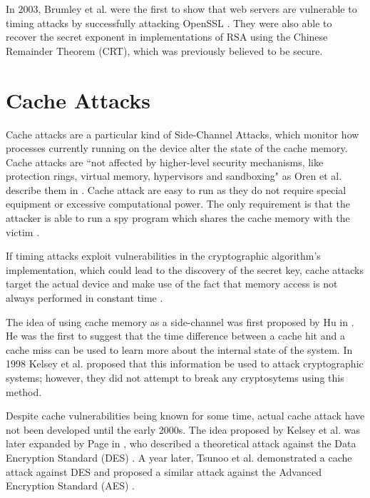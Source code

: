\documentclass[10pt,a4paper,twoside]{book}
\begin{document}
In 2003, Brumley et al. \cite{brumley2005remote} were the first to show that web servers are vulnerable to timing attacks by successfully attacking OpenSSL \cite{openssl}. They were also able to recover the secret exponent in implementations of RSA using the Chinese Remainder Theorem (CRT), which was previously believed to be secure. 

\section{Cache Attacks}
\label{tb:cacheAttacks}
Cache attacks are a particular kind of Side-Channel Attacks, which monitor how processes currently running on the device alter the state of the cache memory. Cache attacks are ``not affected by higher-level security mechanisms, like protection rings, virtual memory, hypervisors and sandboxing" as Oren et al. describe them in \cite{oren2015spy}. Cache attack are easy to run as they do not require special equipment or excessive computational power. The only requirement is that the attacker is able to run a spy program which shares the cache memory with the victim \cite{oren2015spy}.

If timing attacks exploit vulnerabilities in the cryptographic algorithm's implementation, which could lead to the discovery of the secret key, cache attacks target the actual device and make use of the fact that memory access is not always performed in constant time \cite{canteaut2006understanding}.

The idea of using cache memory as a side-channel was first proposed by Hu in \cite{hu1992lattice}. He was the first to suggest that the time difference between a cache hit and a cache miss can be used to learn more about the internal state of the system. In 1998 Kelsey et al. \cite{kelsey1998side} proposed that this information be used to attack cryptographic systems; however, they did not attempt to break any cryptosytems using this method.

Despite cache vulnerabilities being known for some time, actual cache attack have not been developed until the early 2000s. The idea proposed by Kelsey et al. \cite{kelsey1998side} was later expanded by Page in \cite{page2002theoretical}, who described a theoretical attack against the Data Encryption Standard (DES) \cite{standard1977federal}. A year later, Tsunoo et al. \cite{tsunoo2003cryptanalysis} demonstrated a cache attack against DES and proposed a similar attack against the Advanced Encryption Standard (AES) \cite{pub2001197} .
\end{document}

